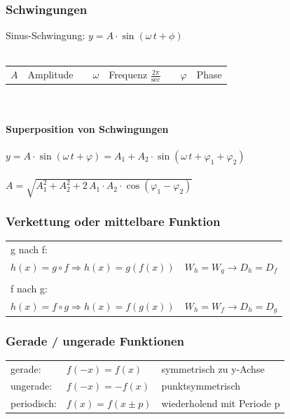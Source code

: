 			\subsubsection{Schwingungen}
			Sinus-Schwingung:  $y = A \cdot \sin(\omega \, t + \phi)$ \\
			\\
			\begin{tabular}{llllllll}
			$A$ & Amplitude & & 
			$\omega$ & Frequenz $\frac{2 \pi}{\mathrm{sec}}$ & & $\varphi$ & Phase \\
			\end{tabular}						
			\\
			
			
			\paragraph{Superposition von Schwingungen} 
			$y = A \cdot \sin(\omega \, t + \varphi)  =  A_1 + A_2 \cdot \sin(\omega \, t + \varphi_1 + \varphi_2)$\\ 
			\\
			$A = \sqrt{A_1^2 + A_2^2 + 2 \,A_1 \cdot A_2 \cdot \cos(\varphi_1 - \varphi_2)}$
			
			
			\subsubsection{Verkettung oder mittelbare Funktion}
			\begin{tabular}{ll} %
			g nach f: & \\
			$h(x)=g \circ f \Rightarrow h(x)=g(f(x))$ & $W_h=W_g \rightarrow D_h=D_f$ \\
			\\
			f nach g: \\
			$h(x)=f \circ g \Rightarrow h(x)=f(g(x))$ & $W_h=W_f \rightarrow D_h=D_g$				
			\end{tabular}
			
			
			\subsubsection{Gerade / ungerade Funktionen}
				\begin{tabular}{lll} 
				 gerade: & $f(-x) = f(x)$ & symmetrisch zu y-Achse \\
				 ungerade: & $f(-x) = -f(x)$ & punktsymmetrisch \\
				 periodisch: & $f(x) = f(x \pm p)$ & wiederholend mit Periode p \\								
				\end{tabular}			
			
